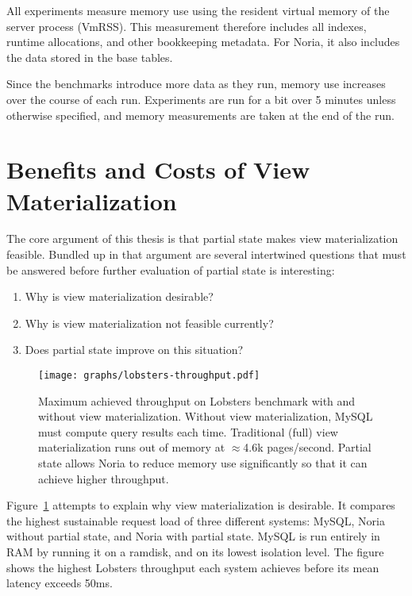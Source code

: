 All experiments measure memory use using the resident virtual memory of the
server process (VmRSS). This measurement therefore includes all indexes, runtime
allocations, and other bookkeeping metadata. For Noria, it also includes the
data stored in the base tables.

Since the benchmarks introduce more data as they run, memory use increases over
the course of each run. Experiments are run for a bit over 5 minutes unless
otherwise specified, and memory measurements are taken at the end of the run.

\section{Benefits and Costs of View Materialization}
\label{s:eval:why}

The core argument of this thesis is that partial state makes view
materialization feasible. Bundled up in that argument are several intertwined
questions that must be answered before further evaluation of partial state is
interesting:

\begin{enumerate}
    \item Why is view materialization desirable?
    \item Why is view materialization not feasible currently?
    \item Does partial state improve on this situation?
\end{enumerate}

\begin{figure}[h]
  \centering
  \texttt{[image: graphs/lobsters-throughput.pdf]}
  \caption{Maximum achieved throughput on Lobsters benchmark with and without
  view materialization. Without view materialization, MySQL must compute query
  results each time. Traditional (full) view materialization runs out of memory
  at $\approx$4.6k pages/second. Partial state allows Noria to reduce memory use
  significantly so that it can achieve higher throughput.}
  \label{f:lobsters-throughput}
\end{figure}

Figure~\ref{f:lobsters-throughput} attempts to explain why view materialization
is desirable. It compares the highest sustainable request load of three
different systems: MySQL, Noria without partial state, and Noria with partial
state. MySQL is run entirely in RAM by running it on a ramdisk, and on its
lowest isolation level. The figure shows the highest Lobsters throughput each
system achieves before its mean latency exceeds 50ms.

